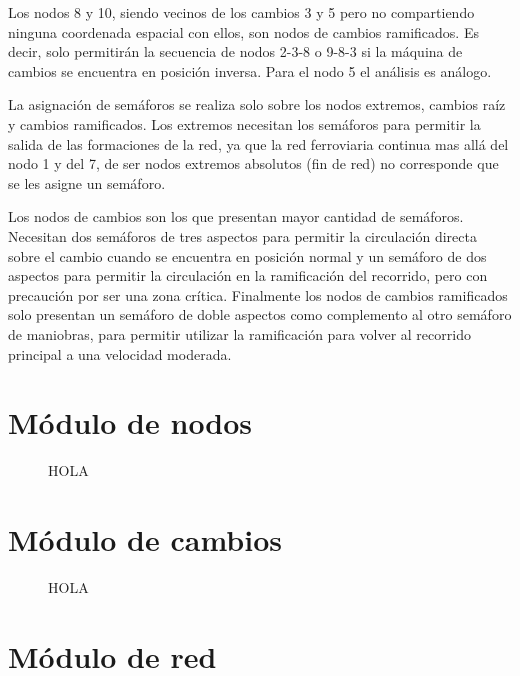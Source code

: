	Los nodos 8 y 10, siendo vecinos de los cambios 3 y 5 pero no compartiendo ninguna coordenada espacial con ellos, son nodos de cambios ramificados. Es decir, solo permitirán la secuencia de nodos 2-3-8 o 9-8-3 si la máquina de cambios se encuentra en posición inversa. Para el nodo 5 el análisis es análogo.

	La asignación de semáforos se realiza solo sobre los nodos extremos, cambios raíz y cambios ramificados. Los extremos necesitan los semáforos para permitir la salida de las formaciones de la red, ya que la red ferroviaria continua mas allá del nodo 1 y del 7, de ser nodos extremos absolutos (fin de red) no corresponde que se les asigne un semáforo.
	
	Los nodos de cambios son los que presentan mayor cantidad de semáforos. Necesitan dos semáforos de tres aspectos para permitir la circulación directa sobre el cambio cuando se encuentra en posición normal y un semáforo de dos aspectos para permitir la circulación en la ramificación del recorrido, pero con precaución por ser una zona crítica. Finalmente los nodos de cambios ramificados solo presentan un semáforo de doble aspectos como complemento al otro semáforo de maniobras, para permitir utilizar la ramificación para volver al recorrido principal a una velocidad moderada. 

\section{Módulo de nodos}

	\begin{figure}[h]
	\centering
		\caption{HOLA}
		\label{fig:hola}
	\end{figure}
	
\section{Módulo de cambios}

	\begin{figure}[h]
	\centering
		\caption{HOLA}
		\label{fig:hola}
	\end{figure}
	
\section{Módulo de red}

